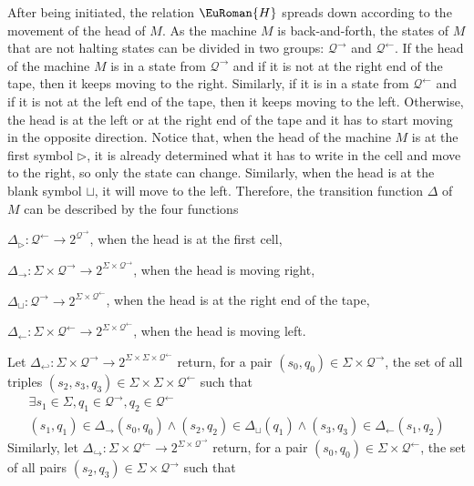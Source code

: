 \documentclass[10pt,a4paper]{amsart}
\theoremstyle{plain}
\theoremstyle{definition}
\numberwithin{equation}{section}
\newcommand{\eurm}[1]{\EuRoman{#1}} %
\newcommand{\euca}[1]{\mathcal{#1}} %
\newcommand{\rel}[1]{\eurm{#1}} %
\newcommand{\family}[1]{\euca{#1}} %
\begin{document}
After being initiated, the relation $\rel{H}$ spreads down according to the movement of the head of $M$.
As the machine $M$ is back-and-forth, the states of $M$ that are not halting states can be divided in two groups: $\family{Q}^\rightarrow$ and $\family{Q}^\leftarrow$.
If the head of the machine $M$ is in a state from $\family{Q}^\rightarrow$ and if it is not at the right end of the tape, then it keeps moving to the right.
Similarly, if it is in a state from $\family{Q}^\leftarrow$ and if it is not at the left end of the tape, then it keeps moving to the left.
Otherwise, the head is at the left or at the right end of the tape and it has to start moving in the opposite direction.
Notice that, when the head of the machine $M$ is at the first symbol $\triangleright$, it is already determined what it has to write in the cell and move to the right, so only the state can change.
Similarly, when the head is at the blank symbol $\sqcup$, it will move to the left.
Therefore, the transition function $\Delta$ of $M$ can be described by the four functions
\begin{compactenum}[(a)]
  \item $\Delta_\triangleright\colon \family{Q}^\leftarrow \to 2^{\family{Q}^\rightarrow}$, when the head is at the first cell,
  \item $\Delta_\rightarrow\colon \Sigma\times\family{Q}^\rightarrow \to 2^{\Sigma\times\family{Q}^\rightarrow}$, when the head is moving right,
  \item $\Delta_\sqcup\colon \family{Q}^\rightarrow \to 2^{\Sigma\times\family{Q}^\leftarrow}$, when the head is at the right end of the tape,
  \item $\Delta_\leftarrow\colon \Sigma\times\family{Q}^\leftarrow \to 2^{\Sigma\times\family{Q}^\leftarrow}$, when the head is moving left.
\end{compactenum}
Let $\Delta_{\hookleftarrow}\colon \Sigma\times\family{Q}^\rightarrow\to 2^{\Sigma\times\Sigma\times\family{Q}^\leftarrow}$ return, for a pair $(s_0,q_0)\in\Sigma\times\family{Q}^\rightarrow$, the set of all triples $(s_2,s_3,q_3)\in\Sigma\times\Sigma\times\family{Q}^\leftarrow$ such that
\begin{multline}
\exists s_1\in\Sigma, q_1\in\family{Q}^\rightarrow,q_2\in\family{Q}^\leftarrow \\ (s_1,q_1)\in\Delta_\rightarrow(s_0,q_0)\wedge (s_2,q_2)\in\Delta_\sqcup(q_1)\wedge(s_3,q_3)\in\Delta_\leftarrow(s_1,q_2)
\end{multline}
Similarly, let $\Delta_{\hookrightarrow}\colon \Sigma\times\family{Q}^\leftarrow\to 2^{\Sigma\times\family{Q}^\rightarrow}$ return, for a pair $(s_0,q_0)\in\Sigma\times\family{Q}^\leftarrow$, the set of all pairs $(s_2,q_3)\in\Sigma\times\family{Q}^\rightarrow$ such that
\end{document}
